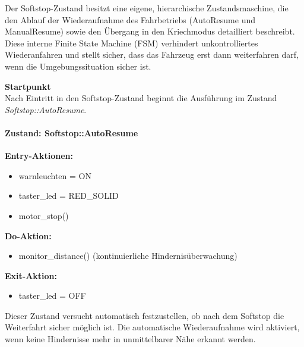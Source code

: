 Der Softstop-Zustand besitzt eine eigene, hierarchische Zustandsmaschine, die den
Ablauf der Wiederaufnahme des Fahrbetriebs (AutoResume und ManualResume) sowie
den Übergang in den Kriechmodus detailliert beschreibt. Diese interne Finite
State Machine (FSM) verhindert unkontrolliertes Wiederanfahren und stellt sicher,
dass das Fahrzeug erst dann weiterfahren darf, wenn die Umgebungssituation
sicher ist.

\textbf{Startpunkt}\\
Nach Eintritt in den Softstop-Zustand beginnt die Ausführung im Zustand
\textit{Softstop::AutoResume}.

\paragraph{Zustand: Softstop::AutoResume}

\textbf{Entry-Aktionen:}
\begin{itemize}
    \item warnleuchten = ON
    \item taster\_led = RED\_SOLID
    \item motor\_stop()
\end{itemize}

\textbf{Do-Aktion:}
\begin{itemize}
    \item monitor\_distance() (kontinuierliche Hindernisüberwachung)
\end{itemize}

\textbf{Exit-Aktion:}
\begin{itemize}
    \item taster\_led = OFF
\end{itemize}

Dieser Zustand versucht automatisch festzustellen, ob nach dem Softstop die
Weiterfahrt sicher möglich ist. Die automatische Wiederaufnahme wird aktiviert,
wenn keine Hindernisse mehr in unmittelbarer Nähe erkannt werden.

